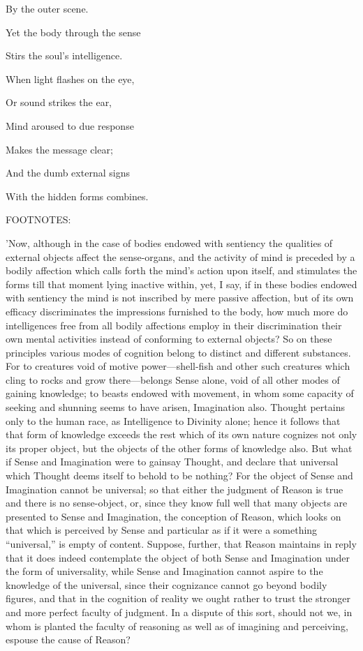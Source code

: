 By the outer scene.

Yet the body through the sense

Stirs the soul's intelligence.

When light flashes on the eye,

Or sound strikes the ear,

Mind aroused to due response

Makes the message clear;

And the dumb external signs

With the hidden forms combines.

FOOTNOTES:


'Now, although in the case of bodies endowed with sentiency the
qualities of external objects affect the sense-organs, and the activity
of mind is preceded by a bodily affection which calls forth the mind's
action upon itself, and stimulates the forms till that moment lying
inactive within, yet, I say, if in these bodies endowed with sentiency
the mind is not inscribed by mere passive affection, but of its own
efficacy discriminates the impressions furnished to the body, how much
more do intelligences free from all bodily affections employ in their
discrimination their own mental activities instead of conforming to
external objects? So on these principles various modes of cognition
belong to distinct and different substances. For to creatures void of
motive power—shell-fish and other such creatures which cling to rocks
and grow there—belongs Sense alone, void of all other modes of gaining
knowledge; to beasts endowed with movement, in whom some capacity of
seeking and shunning seems to have arisen, Imagination also. Thought
pertains only to the human race, as Intelligence to Divinity alone;
hence it follows that that form of knowledge exceeds the rest which of
its own nature cognizes not only its proper object, but the objects of
the other forms of knowledge also. But what if Sense and Imagination
were to gainsay Thought, and declare that universal which Thought deems
itself to behold to be nothing? For the object of Sense and Imagination
cannot be universal; so that either the judgment of Reason is true and
there is no sense-object, or, since they know full well that many
objects are presented to Sense and Imagination, the conception of
Reason, which looks on that which is perceived by Sense and particular
as if it were a something ``universal,'' is empty of content. Suppose,
further, that Reason maintains in reply that it does indeed contemplate
the object of both Sense and Imagination under the form of
universality, while Sense and Imagination cannot aspire to the
knowledge of the universal, since their cognizance cannot go beyond
bodily figures, and that in the cognition of reality we ought rather to
trust the stronger and more perfect faculty of judgment. In a dispute of
this sort, should not we, in whom is planted the faculty of reasoning as
well as of imagining and perceiving, espouse the cause of Reason?

